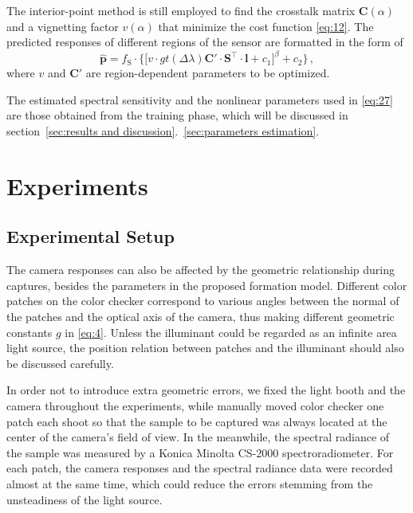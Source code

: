 \documentclass[9pt,twocolumn,twoside]{osajnl}
\begin{document}
The interior-point method is still employed to find the crosstalk matrix $\mathbf{C}(\alpha)$ and a vignetting factor $v(\alpha)$ that minimize the cost function \eqref{eq:12}. The predicted responses of different regions of the sensor are formatted in the form of
\begin{equation}
\hat{\mathbf{p}} = f_\text{S}\cdot\bigg\{\Big[v\cdot{}gt(\Delta\lambda)\mathbf{C}'\cdot\mathbf{S}^\intercal\cdot\mathbf{l} + c_1\Big]^\beta + c_2\bigg\}\,,
\label{eq:26}
\end{equation}
where $v$ and $\mathbf{C}'$ are region-dependent parameters to be optimized.

The estimated spectral sensitivity and the nonlinear parameters used in \eqref{eq:27} are those obtained from the training phase, which will be discussed in section~\ref{sec:results and discussion}.~\ref{sec:parameters estimation}.

\section{Experiments}\label{sec:experiments}

\subsection{Experimental Setup}

The camera responses can also be affected by the geometric relationship during captures, besides the parameters in the proposed formation model. Different color patches on the color checker correspond to various angles between the normal of the patches and the optical axis of the camera, thus making different geometric constants $g$ in \eqref{eq:4}. Unless the illuminant could be regarded as an infinite area light source, the position relation between patches and the illuminant should also be discussed carefully.

In order not to introduce extra geometric errors, we fixed the light booth and the camera throughout the experiments, while manually moved color checker one patch each shoot so that the sample to be captured was always located at the center of the camera’s field of view. In the meanwhile, the spectral radiance of the sample was measured by a Konica Minolta CS-2000 spectroradiometer. For each patch, the camera responses and the spectral radiance data were recorded almost at the same time, which could reduce the errors stemming from the unsteadiness of the light source.
\end{document}
